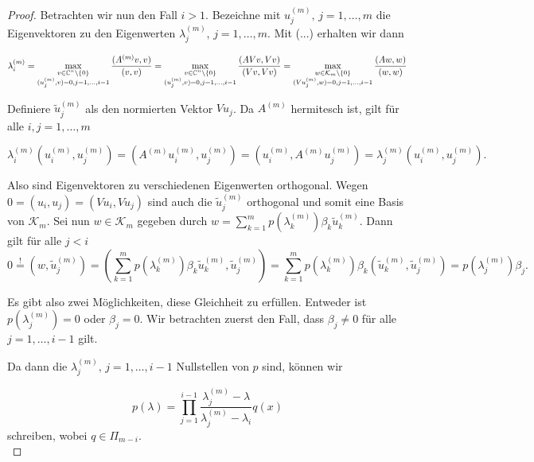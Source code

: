 \documentclass{article}
\begin{document}
\begin{theorem}
\begin{proof}
	Betrachten wir nun den Fall $i>1$.
	Bezeichne mit $u_j^{(m)}, \, j = 1,\dots, m$ die Eigenvektoren zu den Eigenwerten $\lambda_j^{(m)} , \, j = 1,\dots, m$. Mit (...) erhalten wir dann

	\begin{equation*}
		\lambda_i^{(m)} = \max_{\substack{v\in \mathbb{C}^n\setminus \{0\} \\ (u_j^{(m)},v) = 0, j = 1,\dots,i-1}} \frac{(A^{(m)}v,v)}{(v,v)} = \max_{\substack{v\in \mathbb{C}^n\setminus \{0\} \\ (u_j^{(m)},v) = 0, j = 1,\dots,i-1}} \frac{(AVv,Vv)}{(Vv,Vv)} = \max_{\substack{w\in \mathcal{K}_m\setminus \{0\} \\ (Vu_j^{(m)},w) = 0, j = 1,\dots,i-1}} \frac{(Aw,w)}{(w,w)}
	\end{equation*}


	Definiere  $\tilde{u}_j^{(m)}$ als den normierten Vektor $Vu_j$. Da $A^{(m)}$ hermitesch ist, gilt für alle $i,j = 1,\dots, m$

	\begin{equation*}
		\lambda^{(m)}_i (u_i^{(m)}, u_j^{(m)}) = (A^{(m)}u_i^{(m)}, u_j^{(m)}) = (u_i^{(m)}, A^{(m)}u_j^{(m)}) = \lambda^{(m)}_j (u_i^{(m)}, u_j^{(m)}).
	\end{equation*}

	Also sind Eigenvektoren zu verschiedenen Eigenwerten orthogonal. Wegen $ 0 = (u_i, u_j) = (Vu_i, Vu_j)$ sind auch die $\tilde{u}_j^{(m)}$ orthogonal und somit eine Basis von $\mathcal{K}_m$. Sei nun $w\in \mathcal{K}_m$ gegeben durch $w = \sum_{k=1}^{m} p(\lambda_k^{(m)}) \beta_k \tilde{u}_k^{(m)}$. Dann gilt für alle $j < i$
	\begin{equation*}
		0 \stackrel{!}{=} (w,\tilde{u}_j^{(m)}) = (\sum_{k=1}^{m} p(\lambda_k^{(m)}) \beta_k \tilde{u}_k^{(m)},\tilde{u}_j^{(m)}) = \sum_{k=1}^{m} p(\lambda_k^{(m)}) \beta_k (\tilde{u}_k^{(m)},\tilde{u}_j^{(m)}) = p(\lambda_j^{(m)}) \beta_j.
	\end{equation*}

	Es gibt also zwei Möglichkeiten, diese Gleichheit zu erfüllen. Entweder ist $p(\lambda_j^{(m)}) = 0$ oder $\beta_j = 0$. Wir betrachten zuerst den Fall, dass  $\beta_j \neq 0$ für alle $j = 1,\dots, i-1$ gilt.

	Da dann die $\lambda_j^{(m)}, \, j = 1,\dots,i-1$ Nullstellen von $p$ sind, können wir

	\begin{equation*}
		p(\lambda) = \prod_{j = 1}^{i-1} \frac{\lambda_j^{(m)} -\lambda}{\lambda_j^{(m)} - \lambda_i} q(x)
	\end{equation*}
	schreiben, wobei $q \in \Pi_{m-i}$.\\


\end{proof}
\end{theorem}
\end{document}
